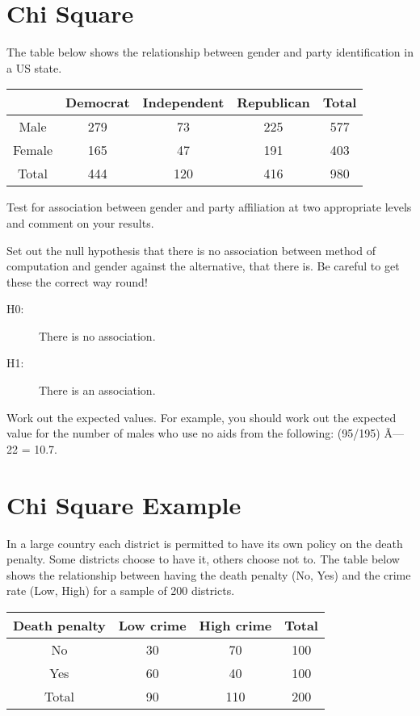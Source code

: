 \documentclass[00-IntroStatsMaster.tex]{subfiles}
\begin{document}
\section{Chi Square}
The table below shows the relationship between gender and party identification in a US state.

\begin{tabular}{|c|c|c|c|c|}
& Democrat	&Independent&	Republican	&Total \\ \hline
Male&	279	&73&	225	& 577 \\ \hline
Female&	165	&47	&191&	403 \\ \hline
Total&	444	&120&	416 &	980 \\ \hline
\end{tabular} 



Test for association between gender and party affiliation at two appropriate levels
and comment on your results.

Set out the null hypothesis that there is no association between method of computation
and gender against the alternative, that there is. Be careful to get these the correct way
round!

\begin{description}
\item[H0:] There is no association.
\item[H1:] There is an association.
\end{description}

Work out the expected values. For example, you should work out the expected value for
the number of males who use no aids from the following: (95/195) Ã— 22 = 10.7.


\section{Chi Square Example}

In a large country each district is permitted to have its own policy on
the death penalty. Some districts choose to have it, others choose not
to. The table below shows the relationship between having the death
penalty (No, Yes) and the crime rate (Low, High) for a sample of 200
districts.

\begin{center}
\begin{tabular}{|c|c c|c|}
	\hline
	Death
	penalty & Low crime & High crime & Total \\ \hline
	No & 30 & 70 & 100\\ \hline
	Yes & 60 & 40 & 100 \\ \hline
	Total & 90 & 110 & 200 \\
	\hline
\end{tabular}
\end{center}
\end{document}
